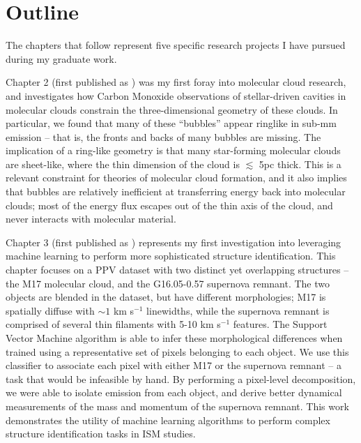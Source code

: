 \section{Outline}
The chapters that follow represent five specific research projects I have pursued during my graduate work.

Chapter 2 (first published as \citealt{Beaumont10}) was my first foray into molecular cloud research, and investigates how Carbon Monoxide observations of stellar-driven cavities in molecular clouds constrain the three-dimensional geometry of these clouds. In particular, we found that many of these ``bubbles'' appear ringlike in sub-mm emission -- that is, the fronts and backs of many bubbles are missing. The implication of a ring-like geometry is that many star-forming molecular clouds are sheet-like, where the thin dimension of the cloud is $\lesssim$ 5pc thick. This is a relevant constraint for theories of molecular cloud formation, and it also implies that bubbles are relatively inefficient at transferring energy back into molecular clouds; most of the energy flux escapes out of the thin axis of the cloud, and never interacts with molecular material.

Chapter 3 (first published as \citealt{Beaumont11}) represents my first investigation into leveraging machine learning to perform more sophisticated structure identification. This chapter focuses on a PPV dataset with two distinct yet overlapping structures -- the M17 molecular cloud, and the G16.05-0.57 supernova remnant. The two objects are blended in the dataset, but have different morphologies; M17 is spatially diffuse with $\sim 1$ km s$^{-1}$ linewidths, while the supernova remnant is comprised of several thin filaments with 5-10 km s$^{-1}$ features. The Support Vector Machine algorithm is able to infer these morphological differences when trained using a representative set of pixels belonging to each object. We use this classifier to associate each pixel with either M17 or the supernova remnant -- a task that would be infeasible by hand. By performing a pixel-level decomposition, we were able to isolate emission from each object, and derive better dynamical measurements of the mass and momentum of the supernova remnant. This work demonstrates the utility of machine learning algorithms to perform complex structure identification tasks in ISM studies.


